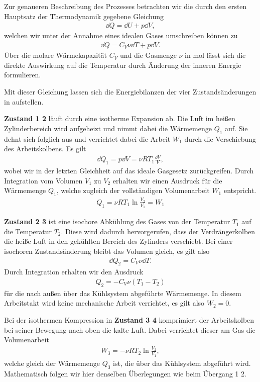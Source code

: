 Zur genaueren Beschreibung des Prozesses betrachten wir die durch den ersten Hauptsatz der Thermodynamik gegebene Gleichung
\begin{align}
  \dd{Q} = \dd{U} + p\dd{V},
\end{align}
welchen wir unter der Annahme eines idealen Gases umschreiben können zu
\begin{align}
  \dd{Q} = C_V \nu \dd{T} + p\dd{V}.
\end{align}
Über die molare Wärmekapazität $C_V$ und die Gasmenge $\nu$ in $\si{\mol}$ lässt sich die direkte Auswirkung auf die Temperatur durch Änderung der inneren Energie formulieren.

Mit dieser Gleichung lassen sich die Energiebilanzen der vier Zustandsänderungen in  aufstellen.

\textbf{Zustand 1 \textrightarrow{} 2} läuft durch eine isotherme Expansion ab. Die Luft im heißen Zylinderbereich wird aufgeheizt und nimmt dabei die Wärmemenge $Q_1$ auf. Sie dehnt sich folglich aus und verrichtet dabei die Arbeit $W_1$ durch die Verschiebung des Arbeitskolbens. Es gilt
\begin{align}
  \dd{Q_1} = p \dd{V} = \nu R T_1 \frac{\dd{V}}{V},
\end{align}
wobei wir in der letzten Gleichheit auf das ideale Gasgesetz zurückgreifen. Durch Integration vom Volumen $V_1$ zu $V_2$ erhalten wir einen Ausdruck für die Wärmemenge $Q_1$, welche zugleich der vollständigen Volumenarbeit $W_1$ entspricht.
\begin{align}
  Q_1 = \nu R T_1 \ln\frac{V_2}{V_1} = W_1
\end{align}

\textbf{Zustand 2 \textrightarrow{} 3} ist eine isochore Abkühlung des Gases von der Temperatur $T_1$ auf die Temperatur $T_2$. Diese wird dadurch hervorgerufen, dass der Verdrängerkolben die heiße Luft in den gekühlten Bereich des Zylinders verschiebt. Bei einer isochoren Zustandsänderung bleibt das Volumen gleich, es gilt also
\begin{align}
  \dd{Q_2} = C_V \nu \dd{T}.
\end{align}
Durch Integration erhalten wir den Ausdruck
\begin{align}
  Q_2 = - C_V \nu (T_1 - T_2)
\end{align}
für die nach außen über das Kühlsystem abgeführte Wärmemenge. In diesem Arbeitstakt wird keine mechanische Arbeit verrichtet, es gilt also $W_2 = 0$.

Bei der isothermen Kompression in \textbf{Zustand 3 \textrightarrow{} 4} komprimiert der Arbeitskolben bei seiner Bewegung nach oben die kalte Luft. Dabei verrichtet dieser am Gas die Volumenarbeit
\begin{align}
  W_3 = -\nu R T_2 \ln\frac{V_2}{V_1},
\end{align}
welche gleich der Wärmemenge $Q_3$ ist, die über das Kühlsystem abgeführt wird. Mathematisch folgen wir hier denselben Überlegungen wie beim Übergang 1 \textrightarrow{} 2.


